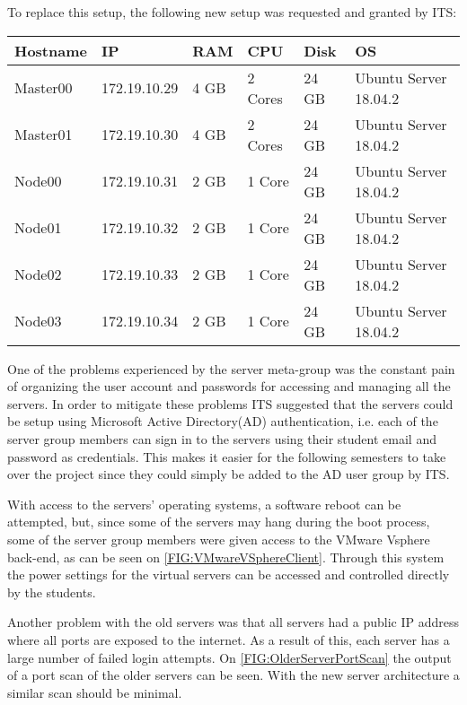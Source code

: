 To replace this setup, the following new setup was requested and granted by ITS:

\begin{table}[H]
\begin{tabular}{|l|l|l|l|l|l|}
\hline
Hostname & IP				& RAM 	& CPU 		& Disk 	& OS 					\\ \hline
Master00 & 172.19.10.29	& 4 GB	& 2 Cores	& 24 GB	& Ubuntu Server 18.04.2	\\ \hline
Master01 & 172.19.10.30	& 4 GB	& 2 Cores	& 24 GB	& Ubuntu Server 18.04.2	\\ \hline
Node00 	& 172.19.10.31	& 2 GB	& 1 Core		& 24 GB	& Ubuntu Server 18.04.2	\\ \hline
Node01 	& 172.19.10.32	& 2 GB	& 1 Core		& 24 GB	& Ubuntu Server 18.04.2	\\ \hline
Node02 	& 172.19.10.33	& 2 GB	& 1 Core		& 24 GB	& Ubuntu Server 18.04.2	\\ \hline
Node03 	& 172.19.10.34	& 2 GB	& 1 Core		& 24 GB	& Ubuntu Server 18.04.2	\\ \hline
\end{tabular}
\end{table}

One of the problems experienced by the server meta-group was the constant pain of organizing the user account and passwords for accessing and managing all the servers.
In order to mitigate these problems ITS suggested that the servers could be setup using Microsoft Active Directory(AD) authentication, i.e. each of the server group members can sign in to the servers using their student email and password as credentials.
This makes it easier for the following semesters to take over the project since they could simply be added to the AD user group by ITS.

With access to the servers' operating systems, a software reboot can be attempted, but, since some of the servers may hang during the boot process, some of the server group members were given access to the VMware Vsphere back-end, as can be seen on \autoref{FIG:VMwareVSphereClient}.
Through this system the power settings for the virtual servers can be accessed and controlled directly by the students.

Another problem with the old servers was that all servers had a public IP address where all ports are exposed to the internet.
As a result of this, each server has a large number of failed login attempts.
On \autoref{FIG:OlderServerPortScan} the output of a port scan of the older servers can be seen.
With the new server architecture a similar scan should be minimal.

